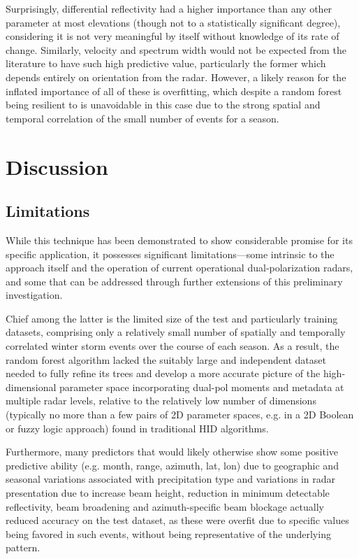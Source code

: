 \documentclass{agujournal}
\begin{document}
Surprisingly, differential reflectivity had a higher importance than any other parameter at most elevations (though not to a statistically significant degree), considering it is not very meaningful by itself without knowledge of its rate of change. Similarly, velocity and spectrum width would not be expected from the literature to have such high predictive value, particularly the former which depends entirely on orientation from the radar. However, a likely reason for the inflated importance of all of these is overfitting, which despite a random forest being resilient to is unavoidable in this case due to the strong spatial and temporal correlation of the small number of events for a season.



\section{Discussion} \label{sec:conclusions}


\subsection{Limitations}

While this technique has been demonstrated to show considerable promise for its specific application, it possesses significant limitations—some intrinsic to the approach itself and the operation of current operational dual-polarization radars, and some that can be addressed through further extensions of this preliminary investigation.

Chief among the latter is the limited size of the test and particularly training datasets, comprising only a relatively small number of spatially and temporally correlated winter storm events over the course of each season. As a result, the random forest algorithm lacked the suitably large and independent dataset needed to fully refine its trees and develop a more accurate picture of the high-dimensional parameter space incorporating dual-pol moments and metadata at multiple radar levels, relative to the relatively low number of dimensions (typically no more than a few pairs of 2D parameter spaces, e.g. in a 2D Boolean or fuzzy logic approach) found in traditional HID algorithms.

Furthermore, many predictors that would likely otherwise show some positive predictive ability (e.g. month, range, azimuth, lat, lon) due to geographic and seasonal variations associated with precipitation type and variations in radar presentation due to increase beam height, reduction in minimum detectable reflectivity, beam broadening and azimuth-specific beam blockage actually reduced accuracy on the test dataset, as these were overfit due to specific values being favored in such events, without being representative of the underlying pattern.
\end{document}
